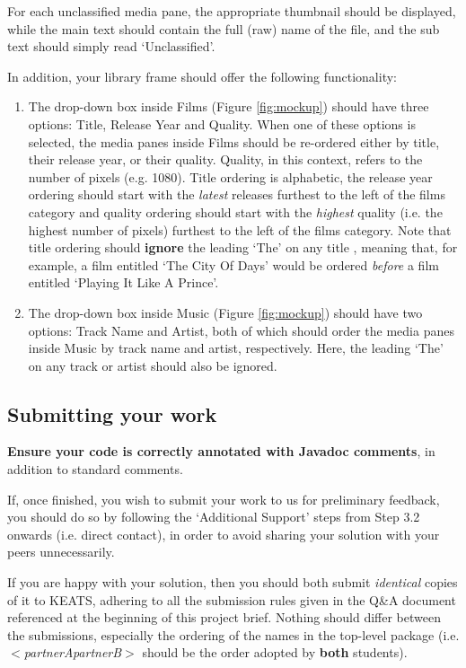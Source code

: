 \documentclass[11pt]{article}
\begin{document}
For each unclassified media pane, the appropriate thumbnail should be displayed, while the main text should contain the full (raw) name of the file, and the sub text should simply read `Unclassified'.

In addition, your library frame should offer the following functionality:

\begin{enumerate}

	\item The drop-down box inside Films (Figure \ref{fig:mockup}) should have three options: Title, Release Year and Quality. When one of these options is selected, the media panes inside Films should be re-ordered either by title, their release year, or their quality. Quality, in this context, refers to the number of pixels (e.g. 1080). Title ordering is alphabetic, the release year ordering should start with the \emph{latest} releases furthest to the left of the films category and quality ordering should start with the \emph{highest} quality (i.e. the highest number of pixels) furthest to the left of the films category. Note that title ordering should \textbf{ignore} the leading `The' on any title , meaning that, for example, a film entitled `The City Of Days' would be ordered \emph{before} a film entitled `Playing It Like A Prince'.

	\item The drop-down box inside Music (Figure \ref{fig:mockup}) should have two options: Track Name and Artist, both of which should order the media panes inside Music by track name and artist, respectively. Here, the leading `The' on any track or artist should also be ignored.
	
\end{enumerate}

\subsection{Submitting your work}

\textbf{Ensure your code is correctly annotated with Javadoc comments}, in addition to standard comments.

If, once finished, you wish to submit your work to us for preliminary feedback, you should do so by following the `Additional Support' steps from Step 3.2 onwards (i.e. direct contact), in order to avoid sharing your solution with your peers unnecessarily.

If you are happy with your solution, then you should both submit \emph{identical} copies of it to KEATS, adhering to all the submission rules given in the Q\&A document referenced at the beginning of this project brief. Nothing should differ between the submissions, especially the ordering of the names in the top-level package (i.e. $<$\emph{partnerApartnerB}$>$ should be the order adopted by \textbf{both} students).
\end{document}
